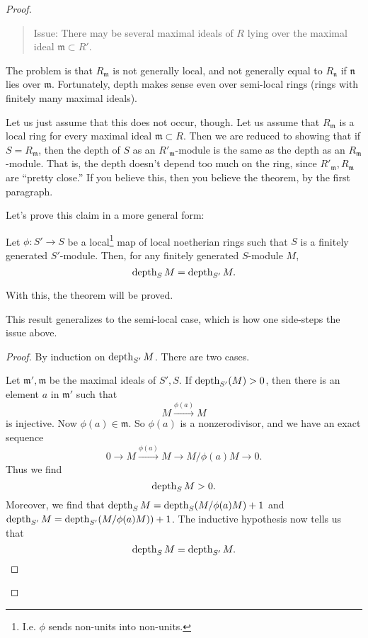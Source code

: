 \begin{example}
\begin{proof}
\begin{quote}
Issue: There may be several maximal ideals of $R$ lying over the
maximal ideal
$\mathfrak{m} \subset R'$.
\end{quote}

The problem is that $R_{\mathfrak{m}}$ is not generally local,
and not
generally equal to $R_{\mathfrak{n}}$ if $\mathfrak{n}$ lies
over
$\mathfrak{m}$. Fortunately, depth makes sense even over
semi-local rings
(rings with finitely many maximal ideals).

Let us just assume that this does not occur, though. Let us
assume that
$R_{\mathfrak{m}}$ is a local ring for every maximal ideal
$\mathfrak{m}
\subset R$. Then we are reduced to showing that if $S =
R_{\mathfrak{m}}$,
then the depth of $S$ as an $R'_{\mathfrak{m}}$-module is the
same as the
depth as an $R_{\mathfrak{m}}$-module. That is, the depth
doesn't depend too
much on the ring, since $R'_{\mathfrak{m}}, R_{\mathfrak{m}}$
are ``pretty
close.'' If you believe this, then you believe the theorem, by
the first
paragraph.


Let's prove this claim in a more general form:

\begin{proposition}
Let $\phi: S' \to S$ be a local\footnote{I.e. $\phi$ sends
non-units into
non-units.} map of local noetherian rings such that $S$ is a
finitely generated
$S'$-module. Then, for any finitely generated $S$-module $M$,
\[ \operatorname{depth}_S M = \operatorname{depth}_{S'} M.  \]
\end{proposition}
With this, the theorem will be proved.

\begin{remark}
This result generalizes to the semi-local case, which is how
one side-steps
the issue above.
\end{remark}

\begin{proof}
By induction on $\operatorname{depth}_{S'} M$. There are two cases.

Let $\mathfrak{m}', \mathfrak{m}$ be the maximal ideals of $S',
S$.
If $\operatorname{depth}_{S'}(M) >0$, then there is an element $a$ in
$\mathfrak{m}'$ such
that
\[ M \stackrel{\phi(a)}{\to} M \]
is injective. Now $\phi(a) \in \mathfrak{m}$. So $\phi(a)$ is a
nonzerodivisor, and we have an exact sequence
\[ 0 \to M \stackrel{\phi(a)}{\to} M \to M/\phi(a) M \to 0.  \]
Thus we find
\[ \operatorname{depth}_{S} M > 0 . \]
Moreover, we find that $\operatorname{depth}_S M = \operatorname{depth}_S (M/\phi(a) M) +1$
and
$\operatorname{depth}_{S'} M = \operatorname{depth}_{S'}(M/\phi(a) M))+1$. The inductive
hypothesis now
tells us that
\[ \operatorname{depth}_S M = \operatorname{depth}_{S'}M.  \]


\end{proof}
\end{proof}
\end{example}
